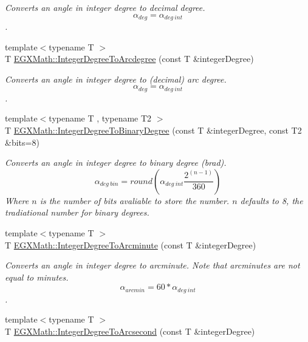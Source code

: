 \begin{DoxyCompactItemize}
\begin{DoxyCompactList}\small\item\em Converts an angle in integer degree to decimal degree. \[\alpha_{deg}=\alpha_{deg\ int}\]. \end{DoxyCompactList}\item 
{\footnotesize template$<$typename T $>$ }\\T \mbox{\hyperlink{group___e_g_x_math-_conversions-_angle_conversions-_integer_degree_gaf633d0b82bfb7586ce86ffbcf78d8f7a}{E\+G\+X\+Math\+::\+Integer\+Degree\+To\+Arcdegree}} (const T \&integer\+Degree)
\begin{DoxyCompactList}\small\item\em Converts an angle in integer degree to (decimal) arc degree. \[\alpha_{deg}=\alpha_{deg\ int}\]. \end{DoxyCompactList}\item 
{\footnotesize template$<$typename T , typename T2 $>$ }\\T \mbox{\hyperlink{group___e_g_x_math-_conversions-_angle_conversions-_integer_degree_ga694bbfe624c3c14e97ce6155ca9bc44d}{E\+G\+X\+Math\+::\+Integer\+Degree\+To\+Binary\+Degree}} (const T \&integer\+Degree, const T2 \&bits=8)
\begin{DoxyCompactList}\small\item\em Converts an angle in integer degree to binary degree (brad). \[\alpha_{deg\ bin}=round(\alpha_{deg\ int}\frac{2^{(n-1)}}{360})\] Where $n$ is the number of bits avaliable to store the number. $n$ defaults to 8, the tradiational number for binary degrees. \end{DoxyCompactList}\item 
{\footnotesize template$<$typename T $>$ }\\T \mbox{\hyperlink{group___e_g_x_math-_conversions-_angle_conversions-_integer_degree_ga78b014e7649d666a3647c467e64e4fe8}{E\+G\+X\+Math\+::\+Integer\+Degree\+To\+Arcminute}} (const T \&integer\+Degree)
\begin{DoxyCompactList}\small\item\em Converts an angle in integer degree to arcminute. Note that arcminutes are not equal to minutes. \[\alpha_{arcmin}= 60 * \alpha_{deg\ int}\]. \end{DoxyCompactList}\item 
{\footnotesize template$<$typename T $>$ }\\T \mbox{\hyperlink{group___e_g_x_math-_conversions-_angle_conversions-_integer_degree_gaa04058a2fea3dc3678264a05fac6e1ae}{E\+G\+X\+Math\+::\+Integer\+Degree\+To\+Arcsecond}} (const T \&integer\+Degree)

\end{DoxyCompactItemize}
